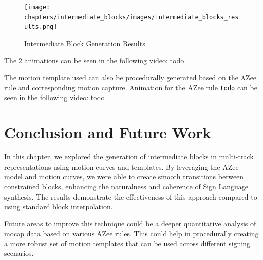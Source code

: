 \documentclass[../../main.tex]{subfiles}
\begin{document}
\begin{figure}
    \centering \texttt{[image: chapters/intermediate\_blocks/images/intermediate\_blocks\_results.png]}
    \caption{Intermediate Block Generation Results}
    \label{fig:intermediate_blocks_results}
\end{figure}

The 2 animations can be seen in the following video: \url{todo}

The motion template used can also be procedurally generated based on the AZee rule and corresponding motion capture. Animation for the AZee rule \texttt{todo} can be seen in the following video: \url{todo}

\section{Conclusion and Future Work}
\label{ch:intermediate_blocks:conclusion_and_future_work}

In this chapter, we explored the generation of intermediate blocks in multi-track representations using motion curves and templates. By leveraging the AZee model and motion curves, we were able to create smooth transitions between constrained blocks, enhancing the naturalness and coherence of Sign Language synthesis. The results demonstrate the effectiveness of this approach compared to using standard block interpolation. 

Future areas to improve this technique could be a deeper quantitative analysis of mocap data based on various AZee rules. This could help in procedurally creating a more robust set of motion templates that can be used across different signing scenarios.
\end{document}
